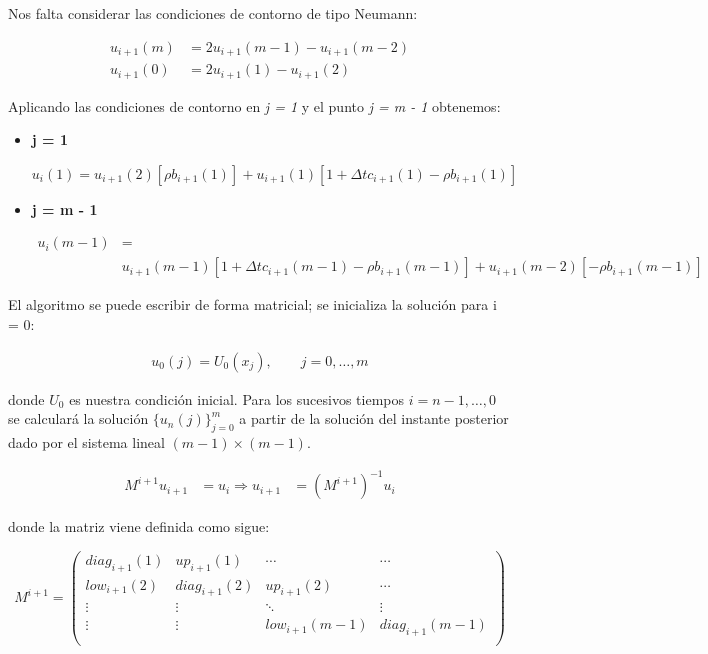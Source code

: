 \documentclass[titlepage, 10pt,]{article}
\begin{document}
Nos falta considerar las condiciones de contorno de tipo Neumann:

\begin{align*}
	u_{i+1}(m) &= 2u_{i+1}(m-1) - u_{i+1}(m-2)\\
	u_{i+1}(0) &= 2u_{i+1}(1) - u_{i+1}(2)
\end{align*}
	
Aplicando las condiciones de contorno en \textit{j = 1} y el punto \textit{j = m - 1} obtenemos: 

\begin{itemize}
	\item \textbf{j = 1}

		\begin{center}
			$u_{i}(1) = u_{i+1}(2)[\rho b_{i+1}(1)] + u_{i+1}(1)[1 + \Delta t c_{i+1}(1) - \rho b_{i+1}(1)]$
		\end{center}
		
	\item \textbf{j = m - 1}


		\begin{align*}
			u_{i}(m - 1) &= \\
			& u_{i+1}(m - 1)[1 + \Delta t c_{i+1}(m - 1) - \rho b_{i+1}(m - 1)] + u_{i+1}(m - 2)[-\rho b_{i+1}(m - 1)]
		\end{align*}

\end{itemize}

El algoritmo se puede escribir de forma matricial; se inicializa la solución para i = 0:

		\begin{align*}
			u_0(j) = U_0(x_j), \qquad j=0,\ldots,m
		\end{align*}

donde $U_0$ es nuestra condición inicial. Para los sucesivos tiempos $i=n-1,\ldots,0$ se calculará la solución $\lbrace u_n(j) \rbrace^m_{j=0}$ a partir de la solución del instante posterior dado por el sistema lineal $(m-1)\times (m-1)$.

\begin{align*}
	M^{i+1}u_{i+1} &= u_{i} \Longrightarrow
	u_{i+1} &= (M^{i+1})^{-1} u_{i}
\end{align*}

donde la matriz viene definida como sigue:


\begin{center}
$$ M^{i+1} = 
	\begin{pmatrix}
		diag_{i+1}(1) & up_{i+1}(1) & \cdots & \cdots \\
		low_{i+1}(2) & diag_{i+1}(2) & up_{i+1}(2) & \cdots \\
		\vdots  & \vdots  & \ddots & \vdots  \\
		\vdots  & \vdots  & low_{i+1}(m - 1) & diag_{i+1}(m - 1) \\ 
	\end{pmatrix}
$$
\end{center}
\end{document}
